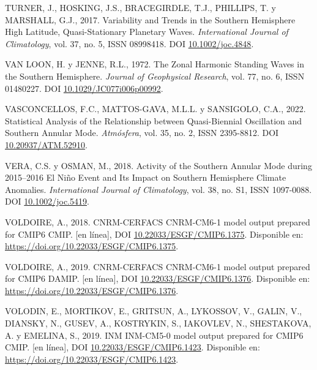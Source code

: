 \documentclass[12pt,oneside,a4paper]{reedthesis}
\newlength{\cslhangindent}
\newenvironment{CSLReferences}[2] %
 {%
  \setlength{\parindent}{0pt}
  \ifodd #1 \everypar{\setlength{\hangindent}{\cslhangindent}}\ignorespaces\fi
  \ifnum #2 > 0
  \setlength{\parskip}{#2\baselineskip}
  \fi
 }%
 {}
\begin{document}
\begin{CSLReferences}{1}{0}
\leavevmode{}%
TURNER, J., HOSKING, J.S., BRACEGIRDLE, T.J., PHILLIPS, T. y MARSHALL, G.J., 2017. Variability and Trends in the {Southern Hemisphere} High Latitude, Quasi-Stationary Planetary Waves. \emph{International Journal of Climatology}, vol. 37, no. 5, ISSN 08998418. DOI \href{https://doi.org/10.1002/joc.4848}{10.1002/joc.4848}.

\leavevmode{}%
VAN LOON, H. y JENNE, R.L., 1972. The Zonal Harmonic Standing Waves in the Southern Hemisphere. \emph{Journal of Geophysical Research}, vol. 77, no. 6, ISSN 01480227. DOI \href{https://doi.org/10.1029/JC077i006p00992}{10.1029/JC077i006p00992}.

\leavevmode{}%
VASCONCELLOS, F.C., MATTOS-GAVA, M.L.L. y SANSIGOLO, C.A., 2022. Statistical Analysis of the Relationship between {Quasi-Biennial Oscillation} and {Southern Annular Mode}. \emph{Atm{ó}sfera}, vol. 35, no. 2, ISSN 2395-8812. DOI \href{https://doi.org/10.20937/ATM.52910}{10.20937/ATM.52910}.

\leavevmode{}%
VERA, C.S. y OSMAN, M., 2018. Activity of the {Southern Annular Mode} during 2015--2016 {El Ni{ñ}o} Event and Its Impact on {Southern Hemisphere} Climate Anomalies. \emph{International Journal of Climatology}, vol. 38, no. S1, ISSN 1097-0088. DOI \href{https://doi.org/10.1002/joc.5419}{10.1002/joc.5419}.

\leavevmode{}%
VOLDOIRE, A., 2018. CNRM-CERFACS CNRM-CM6-1 model output prepared for CMIP6 CMIP. {[}en línea{]}, DOI \href{https://doi.org/10.22033/ESGF/CMIP6.1375}{10.22033/ESGF/CMIP6.1375}. Disponible en: \url{https://doi.org/10.22033/ESGF/CMIP6.1375}.

\leavevmode{}%
VOLDOIRE, A., 2019. CNRM-CERFACS CNRM-CM6-1 model output prepared for CMIP6 DAMIP. {[}en línea{]}, DOI \href{https://doi.org/10.22033/ESGF/CMIP6.1376}{10.22033/ESGF/CMIP6.1376}. Disponible en: \url{https://doi.org/10.22033/ESGF/CMIP6.1376}.

\leavevmode{}%
VOLODIN, E., MORTIKOV, E., GRITSUN, A., LYKOSSOV, V., GALIN, V., DIANSKY, N., GUSEV, A., KOSTRYKIN, S., IAKOVLEV, N., SHESTAKOVA, A. y EMELINA, S., 2019. INM INM-CM5-0 model output prepared for CMIP6 CMIP. {[}en línea{]}, DOI \href{https://doi.org/10.22033/ESGF/CMIP6.1423}{10.22033/ESGF/CMIP6.1423}. Disponible en: \url{https://doi.org/10.22033/ESGF/CMIP6.1423}.


\end{CSLReferences}
\end{document}
